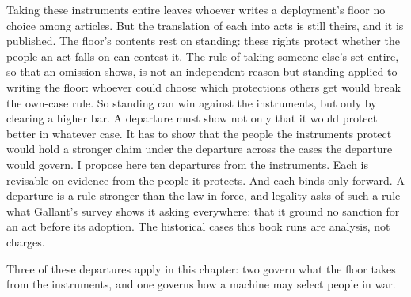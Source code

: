 Taking these instruments entire leaves whoever writes a deployment's floor no choice among articles. But the translation of each into acts is still theirs, and it is published. The floor's contents rest on standing: these rights protect whether the people an act falls on can contest it. The rule of taking someone else's set entire, so that an omission shows, is not an independent reason but standing applied to writing the floor: whoever could choose which protections others get would break the own-case rule. So standing can win against the instruments, but only by clearing a higher bar. A departure must show not only that it would protect better in whatever case. It has to show that the people the instruments protect would hold a stronger claim under the departure across the cases the departure would govern. I propose here ten departures from the instruments. Each is revisable on evidence from the people it protects.
And each binds only forward. A departure is a rule stronger than the law in force, and legality asks of such a rule what Gallant's survey shows it asking everywhere: that it ground no sanction for an act before its adoption.\autocite[352–403]{gallant2009legality} The historical cases this book runs are analysis, not charges.

Three of these departures apply in this chapter: two govern what the floor takes from the instruments, and one governs how a machine may select people in war.

